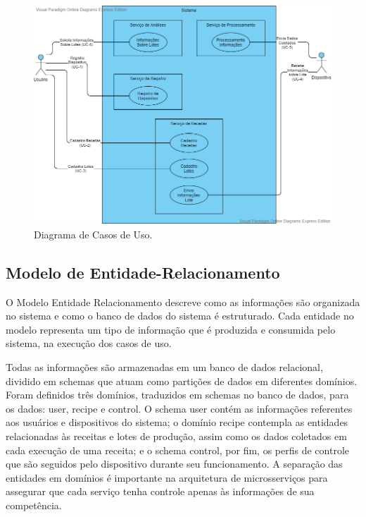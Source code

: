 \begin{figure}[H]
    \centering
    \includegraphics[scale=0.45]{figuras/projeto/software/diagrama_casos_de_uso.png}
    \caption{Diagrama de Casos de Uso.}
    \label{fig:diagrama_caso_de_usos}
\end{figure}

\subsection{Modelo de Entidade-Relacionamento}

O Modelo Entidade Relacionamento descreve como as informações são organizada no sistema e como o banco de dados do sistema é estruturado. 
Cada entidade no modelo representa um tipo de informação que é produzida e consumida pelo sistema, na execução dos casos de uso. 

Todas as informações são armazenadas em um banco de dados relacional, dividido em schemas que atuam como partições de dados em diferentes domínios. 
Foram definidos três domínios, traduzidos em schemas no banco de dados, para os dados: user, recipe e control. O schema user contém as informações 
referentes aos usuários e dispositivos do sistema; o domínio recipe contempla as entidades relacionadas às receitas e lotes de produção, assim como 
os dados coletados em cada execução de uma receita; e o schema control, por fim, os perfis de controle que são seguidos pelo dispositivo durante 
seu funcionamento. A separação das entidades em domínios é importante na arquitetura de microsserviços para assegurar que cada serviço tenha 
controle apenas às informações de sua competência. 

